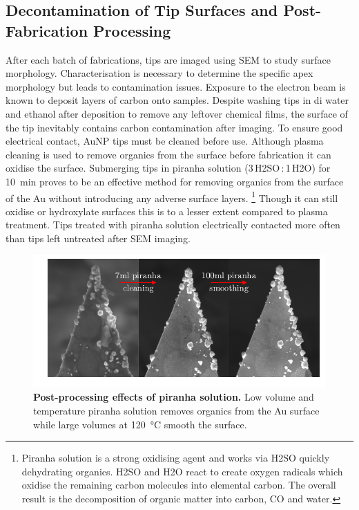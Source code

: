 \documentclass{article}
\begin{document}
\subsection{Decontamination of Tip Surfaces and Post-Fabrication Processing}

After each batch of fabrications, tips are imaged using SEM to study surface morphology. Characterisation is necessary to determine the specific apex morphology but leads to contamination issues. Exposure to the electron beam is known to deposit layers of carbon onto samples. Despite washing tips in \gls{di} water and ethanol after deposition to remove any leftover chemical films, the surface of the tip inevitably contains carbon contamination after imaging. To ensure good electrical contact, AuNP tips must be cleaned before use. Although plasma cleaning is used to remove organics from the surface before fabrication it can oxidise the surface. Submerging tips in piranha solution (3\,H\subs2SO\,:\,1\,H\subs2O) for \SI{10}{\minute} proves to be an effective method for removing organics from the surface of the Au without introducing any adverse surface layers.%
\footnote{Piranha solution is a strong oxidising agent and works via H\subs2SO quickly dehydrating organics. H\subs2SO and H\subs2O react to create oxygen radicals which oxidise the remaining carbon molecules into elemental carbon. The overall result is the decomposition of organic matter into carbon, CO and water.}
Though it can still oxidise or hydroxylate surfaces this is to a lesser extent compared to plasma treatment. Tips treated with piranha solution electrically contacted more often than tips left untreated after SEM imaging.

\begin{figure}[bt]
\centering
\includegraphics[clip=true, trim=20 20 0 0]{figures/tip_post_processing}
\caption[Post-processing effects of piranha solution.]{\textbf{Post-processing effects of piranha solution.} Low volume and temperature piranha solution removes organics from the Au surface while large volumes at \SI{120}{\celsius} smooth the surface.}
\label{fig:tip_post_processing}
\end{figure}
\end{document}

